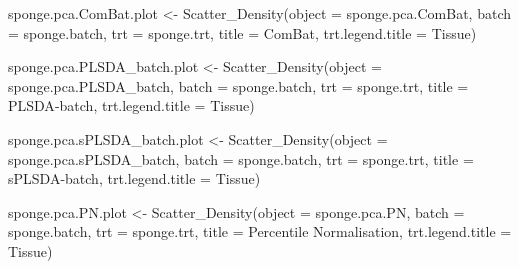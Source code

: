 \documentclass[
]{book}
\newenvironment{Shaded}{\begin{snugshade}}{\end{snugshade}}
\newcommand{\AttributeTok}[1]{\textcolor[rgb]{0.77,0.63,0.00}{#1}}
\newcommand{\FunctionTok}[1]{\textcolor[rgb]{0.00,0.00,0.00}{#1}}
\newcommand{\NormalTok}[1]{#1}
\newcommand{\OtherTok}[1]{\textcolor[rgb]{0.56,0.35,0.01}{#1}}
\newcommand{\StringTok}[1]{\textcolor[rgb]{0.31,0.60,0.02}{#1}}
\begin{document}
\begin{Shaded}
\begin{Highlighting}[]
\NormalTok{sponge.pca.ComBat.plot }\OtherTok{\textless{}{-}} 
  \FunctionTok{Scatter\_Density}\NormalTok{(}\AttributeTok{object =}\NormalTok{ sponge.pca.ComBat, }
                  \AttributeTok{batch =}\NormalTok{ sponge.batch, }
                  \AttributeTok{trt =}\NormalTok{ sponge.trt, }
                  \AttributeTok{title =} \StringTok{\textquotesingle{}ComBat\textquotesingle{}}\NormalTok{, }
                  \AttributeTok{trt.legend.title =} \StringTok{\textquotesingle{}Tissue\textquotesingle{}}\NormalTok{)}
\end{Highlighting}
\end{Shaded}

\begin{Shaded}
\begin{Highlighting}[]
\NormalTok{sponge.pca.PLSDA\_batch.plot }\OtherTok{\textless{}{-}} 
  \FunctionTok{Scatter\_Density}\NormalTok{(}\AttributeTok{object =}\NormalTok{ sponge.pca.PLSDA\_batch, }
                  \AttributeTok{batch =}\NormalTok{ sponge.batch, }
                  \AttributeTok{trt =}\NormalTok{ sponge.trt, }
                  \AttributeTok{title =} \StringTok{\textquotesingle{}PLSDA{-}batch\textquotesingle{}}\NormalTok{, }
                  \AttributeTok{trt.legend.title =} \StringTok{\textquotesingle{}Tissue\textquotesingle{}}\NormalTok{)}
\end{Highlighting}
\end{Shaded}

\begin{Shaded}
\begin{Highlighting}[]
\NormalTok{sponge.pca.sPLSDA\_batch.plot }\OtherTok{\textless{}{-}} 
  \FunctionTok{Scatter\_Density}\NormalTok{(}\AttributeTok{object =}\NormalTok{ sponge.pca.sPLSDA\_batch, }
                  \AttributeTok{batch =}\NormalTok{ sponge.batch, }
                  \AttributeTok{trt =}\NormalTok{ sponge.trt, }
                  \AttributeTok{title =} \StringTok{\textquotesingle{}sPLSDA{-}batch\textquotesingle{}}\NormalTok{, }
                  \AttributeTok{trt.legend.title =} \StringTok{\textquotesingle{}Tissue\textquotesingle{}}\NormalTok{)}
\end{Highlighting}
\end{Shaded}

\begin{Shaded}
\begin{Highlighting}[]
\NormalTok{sponge.pca.PN.plot }\OtherTok{\textless{}{-}} 
  \FunctionTok{Scatter\_Density}\NormalTok{(}\AttributeTok{object =}\NormalTok{ sponge.pca.PN, }
                  \AttributeTok{batch =}\NormalTok{ sponge.batch, }
                  \AttributeTok{trt =}\NormalTok{ sponge.trt, }
                  \AttributeTok{title =} \StringTok{\textquotesingle{}Percentile Normalisation\textquotesingle{}}\NormalTok{, }
                  \AttributeTok{trt.legend.title =} \StringTok{\textquotesingle{}Tissue\textquotesingle{}}\NormalTok{)}
\end{Highlighting}
\end{Shaded}
\end{document}
